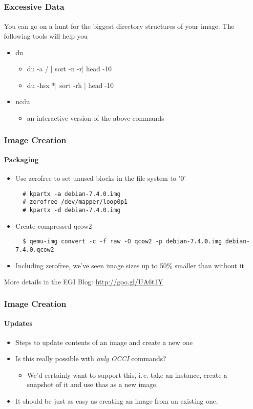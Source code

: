 \begin{frame}
\frametitle{Excessive Data}
\framesubtitle{}
You can go on a hunt for the biggest directory structures of your image. The following tools will help you
\begin{itemize}
\item du
  \begin{itemize}
  \item du -a / | sort -n -r| head -10
  \item du -hsx *| sort -rh | head -10
  \end{itemize}
\item ncdu
  \begin{itemize}
  \item an interactive version of the above commands
  \end{itemize}
\end{itemize}
\end{frame}

\begin{frame}[fragile]
\frametitle{Image Creation}
\framesubtitle{Packaging}
\begin{itemize}
\item Use zerofree to set unused blocks in the file system to '0'
  \begin{lstlisting}
  # kpartx -a debian-7.4.0.img
  # zerofree /dev/mapper/loop0p1
  # kpartx -d debian-7.4.0.img
  \end{lstlisting}
\item Create compressed qcow2
  \begin{lstlisting}
  $ qemu-img convert -c -f raw -O qcow2 -p debian-7.4.0.img debian-7.4.0.qcow2
  \end{lstlisting}
\item Including zerofree, we've seen image sizes up to 50\% smaller
  than without it
\end{itemize}
 More details in the EGI Blog:
  \url{http://goo.gl/UA6t1Y}
\end{frame}


\begin{frame}
\frametitle{Image Creation}
\framesubtitle{Updates}
\begin{itemize}
\item Steps to update contents of an image and create a new one
\item Is this really possible with \emph{only OCCI} commands?
  \begin{itemize}
  \item We'd certainly want to support this, i.\,e. take an instance,
    create a snapshot of it and use thas as a new image.
  \end{itemize}
\item It should be just as easy as creating an image from an existing one.
\end{itemize}
\end{frame}

